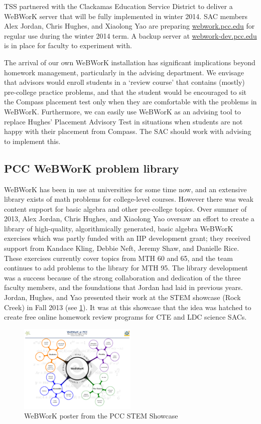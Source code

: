 TSS partnered with the Clackamas Education Service District to deliver a WeBWorK
server that will be fully implemented in winter 2014.  SAC members Alex Jordan,
Chris Hughes, and Xiaolong Yao are preparing
\href{http://webwork.pcc.edu}{webwork.pcc.edu} for regular use during the winter
2014 term. A backup server at
\href{http://webwork-dev.pcc.edu}{webwork-dev.pcc.edu} is in place for faculty
to experiment with. 

The arrival of our own WeBWorK installation has significant implications beyond
homework management, particularly in the advising department. We envisage that
advisors would enroll students in a `review course' that contains (mostly)
pre-college practice problems, and that the student would be encouraged to sit
the Compass placement test only when they are comfortable with the problems in
WeBWorK. Furthermore, we can easily use WeBWorK as an advising tool to replace
Hughes' Placement Advisory Test in situations when students are not happy with
their placement from Compass.  The SAC should work with advising to implement
this. 

\subsection{PCC WeBWorK problem library}
WeBWorK has been in use at universities for some time now, and an extensive
library exists of math problems for college-level courses. However there was
weak content support for basic algebra and other pre-college topics. Over summer
of 2013, Alex Jordan, Chris Hughes, and Xiaolong Yao oversaw an effort to create
a library of high-quality, algorithmically generated, basic algebra WeBWorK
exercises which was partly funded with an IIP development grant; they received
support from Kandace Kling, Debbie Neft, Jeremy Shaw, and Danielle Rice.  These
exercises currently cover topics from MTH 60 and 65, and the team continues to
add problems to the library for MTH 95. The library development was a success
because of the strong collaboration and dedication of the three faculty members,
and the foundations that Jordan had laid in previous years. Jordan, Hughes,
and Yao presented their work at the STEM showcase (Rock Creek) in Fall 2013 (see
\cref{webworkposter}). It was at this showcase that the idea was hatched to
create free online homework review programs for CTE and LDC science SACs.

\begin{figure}[!htb]
	\centering
	\includegraphics[width=0.5\textwidth]{webworkposter.pdf}
	\caption{WeBWorK poster from the PCC STEM Showcase}\label{webworkposter}
\end{figure}

